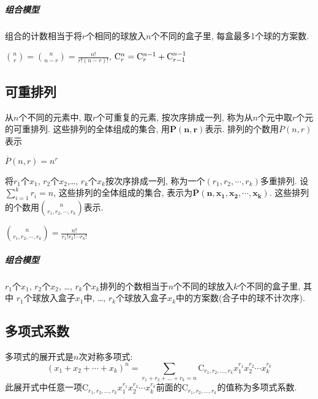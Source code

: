         \subparagraph{组合模型}

            组合的计数相当于将$r$个相同的球放入$n$个不同的盒子里, 每盒最多1个球的方案数.

        \begin{prop}
            ${n\choose r}={n\choose n-r}=\frac{n!}{r!(n-r)!}$, $\mathrm{C}^n_r=\mathrm{C}^{n-1}_r+\mathrm{C}^{n-1}_{r-1}$
        \end{prop}

    \subsection{可重排列}

        \begin{definition}[可重排列]
            从$n$个不同的元素中, 取$r$个可重复的元素, 按次序排成一列, 称为从$n$个元中取$r$个元的\textsf{可重排列}. 这些排列的全体组成的集合, 用$\mathbf{\overline{P}(n,r)}$表示.  排列的个数用$\overline{P}(n,r)$表示
        \end{definition}

        \begin{theorem}
            $\overline{P}(n,r)=n^r$
        \end{theorem}

        \begin{definition}[多重排列]
            将$r_1$个$x_1$, $r_2$个$x_2$,\ldots, $r_k$个$x_k$按次序排成一列, 称为一个$(r_1,r_2,\cdots,r_k)$\textsf{多重排列}. 设$\sum_{i=1}^kr_i=n$, 这些排列的全体组成的集合, 表示为$\mathbf{\overline P(n,x_1,x_2,\cdots,x_k)}$. 这些排列的个数用$n\choose{r_1,r_2,\cdots,r_k}$表示. 
        \end{definition}

        \begin{theorem}
            ${n\choose{r_1,r_2,\cdots,r_k}}=\frac{n!}{r_1!r_2!\cdots r_k!}$
        \end{theorem}

        \subparagraph{组合模型}

            $r_1$个$x_1$, $r_2$个$x_2$, \ldots, $r_k$个$x_k$排列的个数相当于$n$个不同的球放入$k$个不同的盒子里, 其中 $r_1$个球放入盒子$x_1$中, \ldots, $r_k$个球放入盒子$x_k$中的方案数(合子中的球不计次序). 

    \subsection{多项式系数}

        \begin{definition}[多项式系数]
            多项式的展开式是$n$次对称多项式:
            \[(x_1+x_2+\cdots+x_k)^n=\sum_{r_1+r_2+\ldots+r_k=n}\mathrm{C}_{r_1,r_2,\ldots,r_k}x_1^{r_1}x_2^{r_2}\cdots x_k^{r_k}\]
            此展开式中任意一项$\mathrm{C}_{r_1,r_2,\ldots,r_k}x_1^{r_1}x_2^{r_2}\cdots x_k^{r_k}$前面的$\mathrm{C}_{r_1,r_2,\ldots,r_k}$的值称为\textsf{多项式系数}.
        \end{definition}

